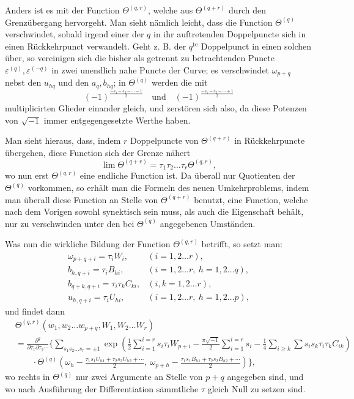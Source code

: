 \documentclass[10pt]{article}
\begin{document}
Anders ist es mit der Function \(\Theta^{(q,r)}\), welche aus \(\Theta^{(q+r)}\) durch den Grenzübergang hervorgeht. Man sieht nämlich leicht, dass die Function \(\Theta^{(q)}\) verschwindet, sobald irgend einer der \(q\) in ihr auftretenden Doppelpuncte sich in einen Rückkehrpunct verwandelt. Geht z. B. der \(q^{\mathrm{te}}\) Doppelpunct in einen solchen über, so vereinigen sich die bisher als getrennt zu betrachtenden Puncte \(\varepsilon^{(q)},\varepsilon^{(-q)}\) in zwei unendlich nahe Puncte der Curve; es verschwindet \(\omega_{p+q}\) nebst den \(u_{hq}\) und den \(a_q,b_{hq}\); in \(\Theta^{(q)}\) werden die mit
\[
(-1)^{\frac{-s_1-s_2-\cdots-1}{2}}
\quad\text{und}\quad
(-1)^{\frac{-s_1-s_2-\cdots+1}{2}}
\]
multiplicirten Glieder einander gleich, und zerstören sich also, da diese Potenzen von \(\sqrt{-1}\) immer entgegengesetzte Werthe haben.

Man sieht hieraus, dass, indem \(r\) Doppelpuncte von \(\Theta^{(q+r)}\) in Rückkehrpuncte übergehen, diese Function sich der Grenze nähert
\[
\lim \Theta^{(q+r)}=\tau_1\tau_2\ldots\tau_r\Theta^{(q,r)},
\]
wo nun erst \(\Theta^{(q,r)}\) eine endliche Function ist. Da überall nur Quotienten der \(\Theta^{(q)}\) vorkommen, so erhält man die Formeln des neuen Umkehrproblems, indem man überall diese Function an Stelle von \(\Theta^{(q+r)}\) benutzt, eine Function, welche nach dem Vorigen sowohl synektisch sein muss, als auch die Eigenschaft behält, nur zu verschwinden unter den bei \(\Theta^{(q)}\) angegebenen Umständen.

Was nun die wirkliche Bildung der Function \(\Theta^{(q,r)}\) betrifft, so setzt man:
\[
\begin{array}{lll}
\omega_{p+q+i}=\tau_iW_i,&(i=1,2\ldots r),\\
b_{h,q+i}=\tau_iB_{hi},&(i=1,2\ldots r,\ h=1,2\ldots q),\\
b_{q+k,q+i}=\tau_i\tau_kC_{ki},&(i,k=1,2\ldots r),\\
u_{h,q+i}=\tau_iU_{hi},&(i=1,2\ldots r,\ h=1,2\ldots p),
\end{array}
\]
und findet dann
\[
\begin{aligned}
&\Theta^{(q,r)}(w_1,w_2\ldots w_{p+q},W_1,W_2\ldots W_r)\\
&=\frac{\partial^q}{\partial\tau_1\partial\tau_2\cdots}
\Bigg\{\sum_{s_1s_2\ldots s_r=\pm1}
\exp\!\left(\frac12\sum_{i=1}^{i=r}s_i\tau_iW_{p+i}
-\frac{\pi\sqrt{-1}}2\sum_{i=1}^{i=r}s_i
-\frac14\sum_{i\ge k}\sum s_is_k\tau_i\tau_kC_{ik}\right)\\
&\qquad\cdot
\Theta^{(q)}\!\left(\omega_h-\frac{\tau_1s_1U_{h1}+\tau_2s_2U_{h2}+\cdots}{2},\
\omega_{p+h}-\frac{\tau_1s_1B_{h1}+\tau_2s_2B_{h2}+\cdots}{2}\right)\Bigg\},
\end{aligned}
\]
wo rechts in \(\Theta^{(q)}\) nur zwei Argumente an Stelle von \(p+q\) angegeben sind, und wo nach Ausführung der Differentiation sämmtliche \(\tau\) gleich Null zu setzen sind.
\end{document}
